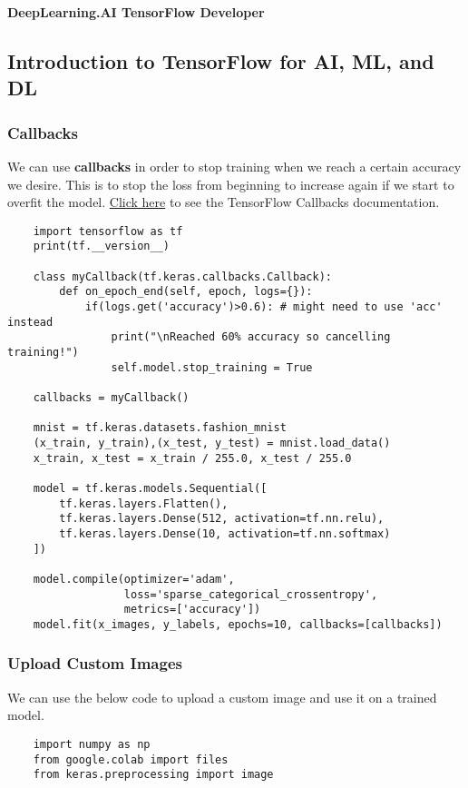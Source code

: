\documentclass[11pt, a4paper]{article}
\begin{document}
	\begin{titlepage}
		\begin{center} \Huge \textbf{DeepLearning.AI TensorFlow Developer} \end{center}
		\tableofcontents
		\newpage
	\end{titlepage}

	\begin{spacing}{1.1}
	\section{Introduction to TensorFlow for AI, ML, and DL}
	\subsubsection{Callbacks}
	We can use \textbf{callbacks} in order to stop training when we reach a certain accuracy we desire. This is to stop the loss from beginning to increase again if we start to overfit the model. \href{https://www.tensorflow.org/api_docs/python/tf/keras/callbacks/Callback}{Click here} to see the TensorFlow Callbacks documentation.
	\begin{lstlisting}
	import tensorflow as tf
	print(tf.__version__)
	
	class myCallback(tf.keras.callbacks.Callback):
		def on_epoch_end(self, epoch, logs={}):
			if(logs.get('accuracy')>0.6): # might need to use 'acc' instead
				print("\nReached 60% accuracy so cancelling training!")
				self.model.stop_training = True
	
	callbacks = myCallback()
	
	mnist = tf.keras.datasets.fashion_mnist
	(x_train, y_train),(x_test, y_test) = mnist.load_data()
	x_train, x_test = x_train / 255.0, x_test / 255.0
	
	model = tf.keras.models.Sequential([
		tf.keras.layers.Flatten(),
		tf.keras.layers.Dense(512, activation=tf.nn.relu),
		tf.keras.layers.Dense(10, activation=tf.nn.softmax)
	])
	
	model.compile(optimizer='adam', 
	              loss='sparse_categorical_crossentropy',
	              metrics=['accuracy'])
	model.fit(x_images, y_labels, epochs=10, callbacks=[callbacks]) \end{lstlisting}\vspace*{1mm}

	\subsubsection{Upload Custom Images}
	We can use the below code to upload a custom image and use it on a trained model.
	\begin{lstlisting}
	import numpy as np
	from google.colab import files
	from keras.preprocessing import image
	

\end{lstlisting}
\end{spacing}
\end{document}
